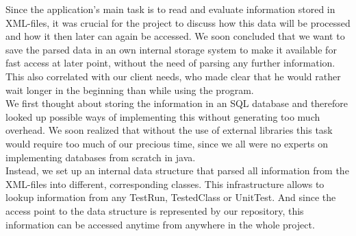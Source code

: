 Since the application's main task is to read and evaluate information stored in XML-files, it was crucial for the project to discuss how this data will be processed and how it then later can again be accessed. We soon concluded that we want to save the parsed data in an own internal storage system to make it available for fast access at later point, without the need of parsing any further information. This also correlated with our client needs, who made clear that he would rather wait longer in the beginning than while using the program.\\
We first thought about storing the information in an SQL database and therefore looked up possible ways of implementing this without generating too much overhead. We soon realized that without the use of external libraries this task would require too much of our precious time, since we all were no experts on implementing databases from scratch in java.\\
Instead, we set up an internal data structure that parsed all information from the XML-files into different, corresponding classes. This infrastructure allows to lookup information from any TestRun, TestedClass or UnitTest. And since the access point to the data structure is represented by our repository, this information can be accessed anytime from anywhere in the whole project.\\




